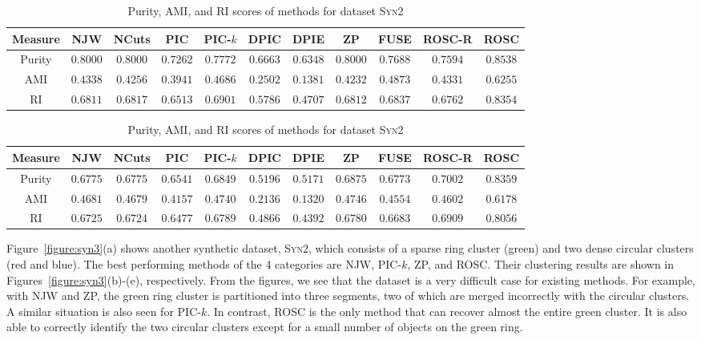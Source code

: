 \begin{table}[!htbp]
\centering
\resizebox{0.9\linewidth}{!}
{
\begin{tabular}{|c||c|c||c|c|c|c||c|c||c|c|} \hline
Measure &NJW & NCuts & PIC & PIC-$k$ & DPIC & DPIE & ZP & FUSE & ROSC-R & ROSC \\ \hline 
Purity & $0.8000$ & $0.8000$ &  $0.7262$ & $0.7772$ & $0.6663$ & $0.6348$ & $0.8000$ & $0.7688$ & $0.7594$ & $\bm{0.8538}$\\ \hline
AMI    & $0.4338$ & $0.4256$ &  $0.3941$ & $0.4686$ & $0.2502$ & $0.1381$ & $0.4232$ & $0.4873$ & $0.4331$ & $\bm{0.6255}$ \\ \hline
RI       & $0.6811$ & $0.6817$ & $0.6513$ & $0.6901$ & $0.5786$ & $0.4707$ & $0.6812$ & $0.6837$ & $0.6762$ & $\bm{0.8354}$\\ \hline
\end{tabular}
}
\caption{Purity, AMI, and RI scores of methods for dataset \textsc{Syn1}}
\label{table:syn1}
\resizebox{0.9\linewidth}{!}
{
\begin{tabular}{|c||c|c||c|c|c|c||c|c||c|c|} \hline
Measure &NJW & NCuts & PIC & PIC-$k$ & DPIC & DPIE & ZP &  FUSE & ROSC-R & ROSC\\ \hline 
Purity & $0.6775$ & $0.6775$ & $0.6541$ & $0.6849$ & $0.5196$ & $0.5171$ & $0.6875$ & $0.6773$ & $0.7002$ & $\bm{0.8359}$\\ \hline
AMI    & $0.4681$ & $0.4679$ & $0.4157$ & $0.4740$ & $0.2136$ & $0.1320$ &$0.4746$ &  $0.4554$ & $0.4602$ & $\bm{0.6178}$\\ \hline
RI       & $0.6725$ & $0.6724$ & $0.6477$ & $0.6789$ & $0.4866$ & $0.4392$ & $0.6780$ & $0.6683$ & $0.6909$ & $\bm{0.8056}$\\ \hline
\end{tabular}
}
\caption{Purity, AMI, and RI scores of methods for dataset  \textsc{Syn2}}
\label{table:syn2}
\end{table}


Figure~\ref{figure:syn3}(a) shows another synthetic dataset, \textsc{Syn2}, which consists of
a sparse ring cluster (green) and two dense circular clusters (red and blue). 
The best performing methods of the 4 categories are NJW, PIC-$k$, ZP, and ROSC.
Their clustering results are shown in Figures~\ref{figure:syn3}(b)-(e), respectively.
From the figures, we see that the dataset is a very difficult case for existing methods. 
For example, with NJW and ZP, the green ring cluster is partitioned into three segments, two of which 
are merged incorrectly with the circular clusters. A similar situation is also seen for PIC-$k$. 
In contrast, ROSC is the only method that can recover almost the entire green cluster. 
It is also able to correctly identify the two circular clusters except for a small number of 
objects on the green ring. 

